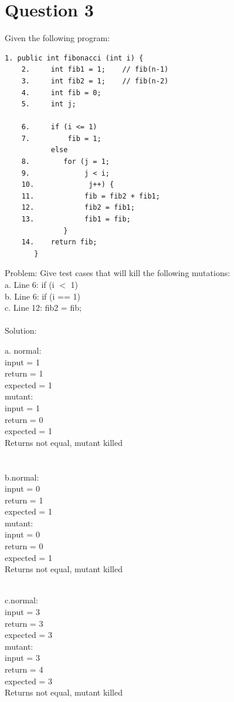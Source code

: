 \documentclass{article}
\begin{document}
\section*{Question 3}
Given the following program:
\begin{Verbatim}[tabsize=4]
	1. public int fibonacci (int i) { 
	2.     int fib1 = 1;    // fib(n-1)
	3.     int fib2 = 1;    // fib(n-2)
	4.     int fib = 0;
	5.     int j;

	6.     if (i <= 1) 
	7.         fib = 1;
	       else 
	8.        for (j = 1;
	9.             j < i;
	10.             j++) {
	11.            fib = fib2 + fib1;
	12.            fib2 = fib1;
	13.            fib1 = fib;
	          }
	14.    return fib;		
	   }
\end{Verbatim}
\bigskip
\noindent
Problem: Give test cases that will kill the following mutations: \\
a. Line 6: if (i $<$ 1)	\\
b. Line 6: if (i == 1)	\\
c. Line 12: fib2 = fib;	\\\\
Solution:\\
\begin{multicols}{2}
\noindent
a. normal: \\
	input = 1 \\
	return = 1 \\
	expected = 1 \\
	mutant: \\
	input = 1 \\
	return = 0 \\
	expected = 1\\
Returns not equal, mutant killed \\\\\\
b.normal: \\
input = 0 \\
return = 1 \\
expected = 1 \\
mutant: \\
input = 0 \\
return = 0 \\
expected = 1 \\
Returns not equal, mutant killed \\\\
\end{multicols}
\noindent
c.normal: \\
input = 3 \\
return = 3 \\
expected = 3 \\
mutant: \\
input = 3 \\
return = 4 \\
expected = 3 \\
Returns not equal, mutant killed \\\\

	
\end{document}
